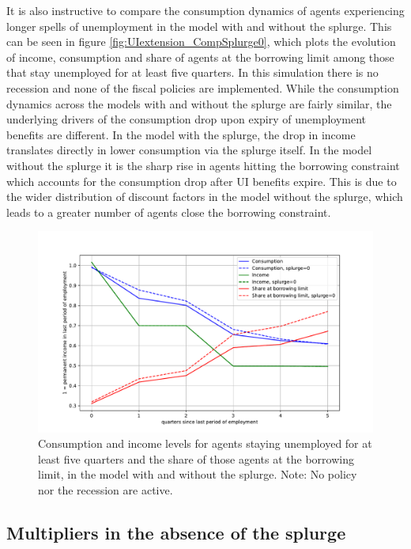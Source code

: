 \documentclass[\econtexRoot/HAFiscal]{subfiles}
\begin{document}
It is also instructive to compare the consumption dynamics of agents experiencing longer spells of unemployment in the model with and without the splurge. This can be seen in figure \ref{fig:UIextension_CompSplurge0}, which plots the evolution of income, consumption and share of agents at the borrowing limit among those that stay unemployed for at least five quarters. In this simulation there is no recession and none of the fiscal policies are implemented. While the consumption dynamics across the models with and without the splurge are fairly similar, the underlying drivers of the consumption drop upon expiry of unemployment benefits are different. In the model with the splurge, the drop in income translates directly in lower consumption via the splurge itself. In the model without the splurge it is the sharp rise in agents hitting the borrowing constraint which accounts for the consumption drop after UI benefits expire. This is due to the wider distribution of discount factors in the model without the splurge, which leads to a greater number of agents close the borrowing constraint. 


\begin{figure}[t]
	\centering
	\includegraphics[width=0.8\linewidth]{Code/HA-Models/FromPandemicCode/Figures/Splurge0/UIextension_CompSplurge0}
	\caption{Consumption and income levels for agents staying unemployed for at least five quarters and the share of those agents at the borrowing limit, in the model with and without the splurge. Note: No policy nor the recession are active.}
	\notinsubfile{\label{fig:UIextension_CompSplurge0}}
\end{figure}


\FloatBarrier
\subsection{Multipliers in the absence of the splurge}
\end{document}
